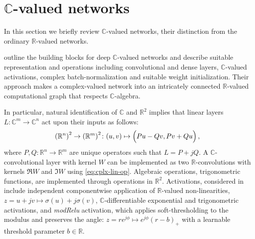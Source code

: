 \documentclass[a4paper,10pt]{article}
\newcommand{\real}{\mathbb{R}}
\newcommand{\cplx}{\mathbb{C}}
\begin{document}



\section{$\cplx$-valued networks} %
\label{sec:c_valued_networks}

In this section we briefly review $\cplx$-valued networks, their distinction from the
ordinary $\real$-valued networks.

\citet{trabelsi_deep_2017} outline the building blocks for deep $\cplx$-valued networks
and describe suitable representation and operations including convolutional and dense layers,
$\cplx$-valued activations, complex batch-normalization and suitable weight initialization.
Their approach makes a complex-valued network into an intricately connected $\real$-valued
computational graph that respects $\cplx$-algebra.

In particular, natural identification of $\cplx$ and $\real^2$ implies that linear layers $
  L \colon \cplx^m \to \cplx^n
$ act upon their inputs as follows:
\begin{equation}  \label{eq:cplx-lin-op}
  {(\real^n)}^{2}
    \to {(\real^m)}^{2}
    \colon (u, v)
      \mapsto \Bigl(
        P u - Q v,
        P v + Q u
      \Bigr)
    \,,
\end{equation}
where $
  P, Q \colon \real^{n} \to \real^{m}
$ are unique operators such that $L = P + j Q$. A $\cplx$-convolutional layer with kernel
$W$ can be implemented as two $\real$-convolutions with kernels $\Re{W}$ and $\Im{W}$ using
\eqref{eq:cplx-lin-op}. Algebraic operations, trigonometric functions, are implemented
through operations in $\real^2$. Activations, considered in \citep{trabelsi_deep_2017} include
independent componentwise application of $\real$-valued non-linearities, $
  z = u + j v
    \mapsto \sigma(u) + j \sigma(v)
$, $\cplx$-differentiable exponential and trigonometric activations, and \textit{modRelu}
activation, which applies soft-thresholding to the modulus and preserves the angle: $
  z = r e^{j \phi}
    \mapsto e^{j \phi} (r - b)_+
$ with a learnable threshold parameter $b \in \real$.
\end{document}
